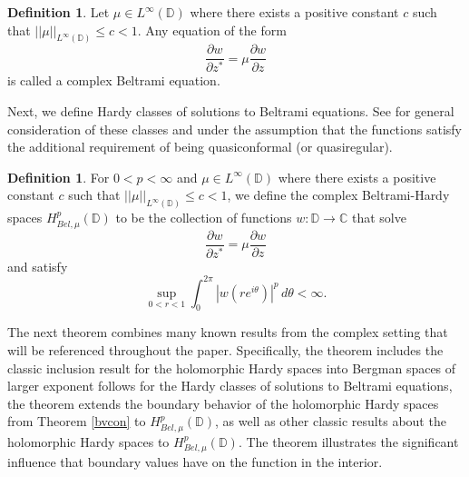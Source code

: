 \documentclass[12pt,reqno]{amsart}
\theoremstyle{definition}
\newtheorem{deff}[theorem]{Definition}
\theoremstyle{remark}
\newcommand{\p}{\partial}
\newcommand{\disk}{\mathbb{D}}
\begin{document}
       
        

        \begin{deff}
            Let $\mu \in L^\infty(\disk)$ where there exists a positive constant $c$ such that $||\mu||_{L^\infty(\disk)} \leq c < 1$. Any equation of the form 
            \[
                \frac{\p w}{\p z^*} = \mu \frac{\p w}{\p z}
            \]
            is called a complex Beltrami equation. 
        \end{deff}

        Next, we define Hardy classes of solutions to Beltrami equations. See \cite{Klim2016, Klim2014, Klim2016Pathlogical} for general consideration of these classes and \cite{quasiHardy, Zins, quasiHardy2, quasiHardy4, quasiHardy5} under the assumption that the functions satisfy the additional requirement of being quasiconformal (or quasiregular). 

        \begin{deff}
            For $0 < p < \infty$ and $\mu \in L^\infty(\disk)$ where there exists a positive constant $c$ such that $||\mu||_{L^\infty(\disk)} \leq c < 1$, we define the complex Beltrami-Hardy spaces $H^p_{Bel,\mu}(\disk)$ to be the collection of functions $w:\disk\to\mathbb{C}$ that solve
            \[
                \frac{\p w}{\p z^*} = \mu \frac{\p w}{\p z}
            \]
            and satisfy  
            \[
            \sup_{0 < r < 1} \int_0^{2\pi} |w(re^{i\theta})|^p\,d\theta  < \infty.
            \]
        \end{deff}

        The next theorem combines many known results from the complex setting that will be referenced throughout the paper. Specifically, the theorem includes the classic inclusion result for the holomorphic Hardy spaces into Bergman spaces of larger exponent follows for the Hardy classes of solutions to Beltrami equations, the theorem extends the boundary behavior of the holomorphic Hardy spaces from Theorem \ref{bvcon} to $H^p_{Bel,\mu}(\disk)$, as well as other classic results about the holomorphic Hardy spaces to $H^p_{Bel,\mu}(\disk)$. The theorem illustrates the significant influence that boundary values have on the function in the interior. 
\end{document}
